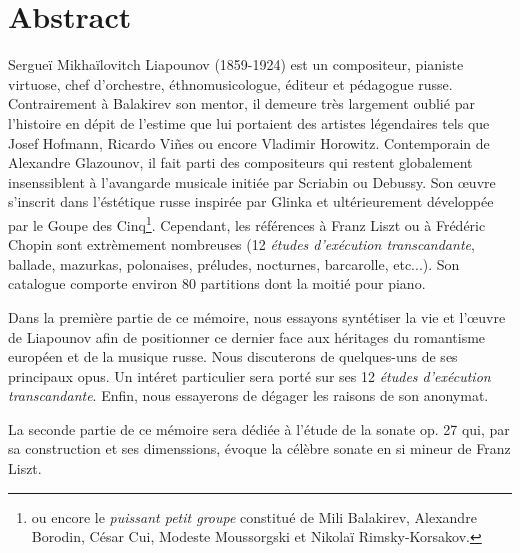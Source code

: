 
\chapter*{Abstract}

Sergueï Mikhaïlovitch Liapounov (1859-1924) est un compositeur, pianiste virtuose,
chef d'orchestre, éthnomusicologue, éditeur et pédagogue russe. Contrairement à
Balakirev son mentor, il demeure très largement oublié par l'histoire en dépit
de l'estime que lui portaient des artistes légendaires tels que Josef Hofmann,
Ricardo Vi\~{n}es ou encore Vladimir Horowitz.
Contemporain de Alexandre Glazounov, il fait parti des compositeurs qui restent
globalement insenssiblent à l'avangarde musicale initiée par Scriabin ou Debussy.
Son œuvre s'inscrit dans l'éstétique russe inspirée par Glinka et ultérieurement
développée par le Goupe des Cinq\footnote{ou encore le \emph{puissant petit groupe}
constitué de Mili Balakirev, Alexandre Borodin, César Cui, Modeste Moussorgski
et Nikolaï Rimsky-Korsakov.}. Cependant, les références à Franz Liszt ou à Frédéric
Chopin sont extrèmement nombreuses (12 \emph{études d'exécution transcandante},
ballade, mazurkas, polonaises, préludes, nocturnes, barcarolle, etc...). Son
catalogue comporte environ 80 partitions dont la moitié pour piano.

Dans la première partie de ce mémoire, nous essayons syntétiser la vie et
l'œuvre de Liapounov afin de positionner ce dernier face aux héritages du
romantisme européen et de la musique russe. Nous discuterons de quelques-uns
de ses principaux opus. Un intéret particulier sera porté sur ses 12
\emph{études d'exécution transcandante}. Enfin, nous essayerons de dégager les
raisons de son anonymat.

La seconde partie de ce mémoire sera dédiée à l'étude de la sonate op. 27 qui,
par sa construction et ses dimenssions, évoque la célèbre sonate en si mineur
de Franz Liszt.

